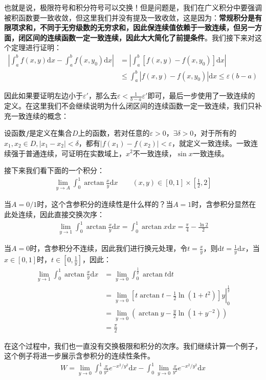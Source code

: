 \documentclass{ctexart}
\let\oldtextbf\textbf
\renewcommand{\textbf}[1]{\textcolor{brown!50!red}{\oldtextbf{#1}}}
\begin{document}
也就是说，极限符号和积分符号可以交换！但是问题是，我们在广义积分中要强调被积函数要一致收敛，但这里我们并没有提及一致收敛，这是因为：\textbf{\color{brown!50!red}常规积分是有限项求和，不同于无穷级数的无穷求和，因此保连续值依赖于一致连续，但另一方面，闭区间的连续函数一定一致连续，因此大大简化了前提条件}。我们接下来对这个定理进行证明：
\begin{align*} 
|\int_a^b f(x,y)\mathrm{d}x-\int_a^b f(x,y_0)\mathrm{d}x|&=|\int_a^b [f(x,y)-f(x,y_0)]\mathrm{d}x|\\
&\leq \int_a^b|f(x,y)-f(x,y_0)|\mathrm{d}x\leq \varepsilon (b-a)
\end{align*}

因此如果要证明左边小于$\varepsilon'$，那么去$\varepsilon<\frac{1}{b-a}\varepsilon'$即可，最后一步使用了一致连续的定义。在这里我们不会继续说明为什么闭区间的连续函数一定一致连续，我们只补充一致连续的概念：

设函数$f$是定义在集合$D$上的函数，若对任意的$\varepsilon>0，\exists \delta>0$，对于所有的$x_1,x_2\in D,|x_1-x_2|<\delta$，都有$|f(x_1)-f(x_2)|<\varepsilon$，就定义一致连续。一致连续强于普通连续，可证明在实数域上，$x^2$不一致连续，$\sin x$一致连续。

接下来我们看下面的一个积分：
\begin{align*}
    \lim_{y\to A}\int_0^1\arctan{\frac{x}{y}}\mathrm{d}x\qquad (x,y)\in[0,1]\times[\frac{1}{2},2]
\end{align*}

当$A=0/1$时，这个含参积分的连续性是什么样的？当$A=1$时，含参积分显然在此处连续，因此直接交换次序：
\begin{align*} 
\lim_{y\to 1}\int_0^1\arctan{\frac{x}{y}}\mathrm{d}x=\int_0^1\arctan x\mathrm{d}x=\frac{\pi}{4}
-\frac{\ln 2}{2}   
\end{align*}

当$A=0$时，含参积分不连续，因此我们进行换元处理，令$t=\frac{x}{y}$，则$\mathrm{d}t=\frac{1}{y}\mathrm{d}x$，当$x\in[0,1]$时，$t\in[0,\frac{1}{y}]$，因此：
\begin{align*} 
\lim_{y\to 1}\int_0^1\arctan{\frac{x}{y}}\mathrm{d}x&=\lim_{y\to 0}\int_0^\frac{1}{y}\arctan t\mathrm{d}t\\
&=\left.\lim_{y\to 0}[t\arctan t-\frac{1}{2}\ln(1+t^2 )]y\right|_0^{\frac{1}{y} } \\
&=\lim_{y\to 0}(\arctan y-\frac{y}{2}\ln(1+y^{-2}))\\&=\frac{\pi}{2} 
\end{align*}


在这个过程中，我们也一直没有交换极限和积分的次序。我们继续计算一个例子，这个例子将进一步展示含参积分的连续性条件。
\begin{align*}
   W= \lim_{y\to 0}\int_0^1\frac{x}{y^2}e^{-x^2/y^2}\mathrm{d}x-\int_0^1\lim_{y\to 0}\frac{x}{y^2}
e^{-x^2/y^2}\mathrm{d}x
\end{align*}
\end{document}
